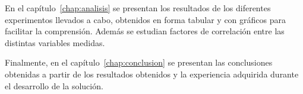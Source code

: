 
En el capítulo~\ref{chap:analisis} se presentan los resultados de los diferentes
experimentos llevados a cabo, obtenidos en forma tabular y con gráficos para
facilitar la comprensión. Además se estudian factores de correlación entre las
distintas variables medidas.


Finalmente, en el capítulo~\ref{chap:conclusion} se presentan las
conclusiones obtenidas a partir de los resultados obtenidos y la experiencia
adquirida durante el desarrollo de la solución.

